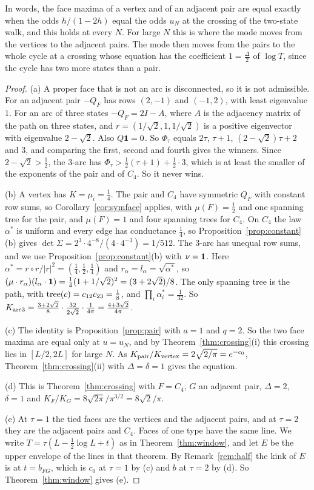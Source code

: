 In words, the face maxima of a vertex and of an adjacent pair are equal exactly when the odds
$h/(1-2h)$ equal the odds $u_N$ at the crossing of the two-state walk, and this holds at every $N$.
For large $N$ this is where the mode moves from the vertices to the adjacent pairs. The mode
then moves from the pairs to the whole cycle at a
crossing whose equation has the coefficient $1=\frac\Delta2$ of $\log T$, since
the cycle has two more states than a pair.

\begin{proof}
(a) A proper face that is not an arc is disconnected, so it is not
admissible. For an adjacent pair $-Q_F$ has rows $(2,-1)$ and $(-1,2)$, with
least eigenvalue $1$. For an arc of three states $-Q_F=2I-A$, where $A$ is the
adjacency matrix of the path on three states, and $r=(1/\sqrt2,1,1/\sqrt2)$ is a
positive eigenvector with eigenvalue $2-\sqrt2$. Also $Q\mathbf{1}=0$. So
$\Phi_\tau$ equals $2\tau$, $\tau+1$, $(2-\sqrt2)\tau+2$ and $3$, and comparing
the first, second and fourth gives the winners. Since $2-\sqrt2>\frac12$, the
3-arc has $\Phi_\tau>\frac12(\tau+1)+\frac12\cdot3$, which is at least the
smaller of the exponents of the pair and of $C_4$. So it never wins.

(b) A vertex has $K=\mu_i=\frac14$. The pair and $C_4$ have symmetric $Q_F$
with constant row sums, so Corollary~\ref{cor:symface} applies, with
$\mu(F)=\frac12$ and one spanning tree for the pair, and $\mu(F)=1$ and four
spanning trees for $C_4$. On $C_4$ the law $\alpha^*$ is uniform and every edge
has conductance $\frac14$, so Proposition~\ref{prop:constant}(b) gives
$\det\Sigma=2^3\cdot4^{-8}/(4\cdot4^{-3})=1/512$. The 3-arc has unequal row
sums, and we use Proposition~\ref{prop:constant}(b) with $\nu=\mathbf{1}$. Here
$\alpha^*=r\circ r/\lvert r\rvert^2=(\frac14,\frac12,\frac14)$ and
$r_\alpha=l_\alpha=\sqrt{\alpha^*}$, so
$(\mu\cdot r_\alpha)(l_\alpha\cdot\mathbf{1})=\frac14(1+1/\sqrt2)^2=(3+2\sqrt2)/8$.
The only spanning tree is the path, with $\operatorname{tree}(c)=c_{12}c_{23}=\frac18$, and
$\prod_i\alpha^*_i=\frac1{32}$. So
$K_{\rm arc3}=\frac{3+2\sqrt2}8\cdot\frac{32}{2\sqrt2}\cdot\frac1{4\pi}
=\frac{4+3\sqrt2}{4\pi}$.

(c) The identity is Proposition~\ref{prop:pair} with $a=1$ and $q=2$. So the
two face maxima are equal only at $u=u_N$, and by
Theorem~\ref{thm:crossing}(i) this crossing lies in $[L/2,2L]$ for large $N$. As
$K_{\rm pair}/K_{\rm vertex}=2\sqrt{2/\pi}=e^{-c_0}$,
Theorem~\ref{thm:crossing}(ii) with $\Delta=\delta=1$ gives the equation.

(d) This is Theorem~\ref{thm:crossing} with $F=C_4$, $G$ an adjacent pair,
$\Delta=2$, $\delta=1$ and $K_F/K_G=8\sqrt{2\pi}/\pi^{3/2}=8\sqrt2/\pi$.

(e) At $\tau=1$ the tied faces are the vertices and the adjacent pairs, and
at $\tau=2$ they are the adjacent pairs and $C_4$. Faces of one type have the
same line. We write $T=\tau(L-\frac12\log L+t)$ as in
Theorem~\ref{thm:window}, and let $E$ be the upper envelope of the lines in
that theorem. By Remark~\ref{rem:half} the kink of $E$ is at $t=b_{FG}$, which is
$c_0$ at $\tau=1$ by (c) and $b$ at $\tau=2$ by (d). So
Theorem~\ref{thm:window} gives (e).
\end{proof}

